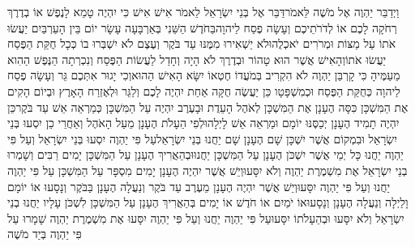 \documentclass[../main/main.tex]{subfiles}
\begin{document}
\begin{multicols*}{\ncols}
וַיְדַבֵּר יַהְוֶה אֶל מֹשֶׁה לֵּאמֹר\PreVerseSpace{}דַּבֵּר אֶל בְּנֵי יִשְׂרָאֵל לֵאמֹר אִישׁ אִישׁ כִּי יִהְיֶה טָמֵא לָנֶפֶשׁ אוֹ בְדֶרֶךְ רְחֹקָה לָכֶם אוֹ לְדֹרֹתֵיכֶם וְעָשָׂה פֶסַח לַיהוָה\PreVerseSpace{}בַּחֹדֶשׁ הַשֵּׁנִי בְּאַרְבָּעָה עָשָׂר יוֹם בֵּין הָעַרְבַּיִם יַעֲשׂוּ אֹתוֹ עַל מַצּוֹת וּמְרֹרִים יֹאכְלֻהוּ\PreVerseSpace{}לֹא יַשְׁאִירוּ מִמֶּנּוּ עַד בֹּקֶר וְעֶצֶם לֹא יִשְׁבְּרוּ בוֹ כְּכָל חֻקַּת הַפֶּסַח יַעֲשׂוּ אֹתוֹ\PreVerseSpace{}וְהָאִישׁ אֲשֶׁר הוּא טָהוֹר וּבְדֶרֶךְ לֹא הָיָה וְחָדַל לַעֲשׂוֹת הַפֶּסַח וְנִכְרְתָה הַנֶּפֶשׁ הַהִוא מֵעַמֶּיהָ כִּי קָרְבַּן יַהְוֶה לֹא הִקְרִיב בְּמֹעֲדוֹ חֶטְאוֹ יִשָּׂא הָאִישׁ הַהוּא\PreVerseSpace{}וְכִי יָגוּר אִתְּכֶם גֵּר וְעָשָׂה פֶסַח לַיהוָה כְּחֻקַּת הַפֶּסַח וּכְמִשְׁפָּטָו\SubEnd{} כֵּן יַעֲשֶׂה חֻקָּה אַחַת יִהְיֶה לָכֶם וְלַגֵּר וּלְאֶזְרַח הָאָרֶץ \ClosedSection{}וּבְיוֹם הָקִים אֶת הַמִּשְׁכָּן כִּסָּה הֶעָנָן אֶת הַמִּשְׁכָּן לְאֹהֶל הָעֵדֻת וּבָעֶרֶב יִהְיֶה עַל הַמִּשְׁכָּן כְּמַרְאֵה אֵשׁ עַד בֹּקֶר\PreVerseSpace{}כֵּן יִהְיֶה תָמִיד הֶעָנָן יְכַסֶּנּוּ יוֹמָם\OmitEnd{} וּמַרְאֵה אֵשׁ לָיְלָה\PreVerseSpace{}וּלְפִי הֵעָלֹת הֶעָנָן מֵעַל הָאֹהֶל וְאַחֲרֵי כֵן יִסְעוּ בְּנֵי יִשְׂרָאֵל וּבִמְקוֹם אֲשֶׁר יִשְׁכָּן שָׁם הֶעָנָן שָׁם יַחֲנוּ בְּנֵי יִשְׂרָאֵל\PreVerseSpace{}עַל פִּי יַהְוֶה יִסְעוּ בְּנֵי יִשְׂרָאֵל וְעַל פִּי יַהְוֶה יַחֲנוּ כָּל יְמֵי אֲשֶׁר יִשְׁכֹּן הֶעָנָן עַל הַמִּשְׁכָּן יַחֲנוּ\PreVerseSpace{}וּבְהַאֲרִיךְ הֶעָנָן עַל הַמִּשְׁכָּן יָמִים רַבִּים וְשָׁמְרוּ בְנֵי יִשְׂרָאֵל אֶת מִשְׁמֶרֶת יַהְוֶה וְלֹא יִסָּעוּ\PreVerseSpace{}וְיֵשׁ אֲשֶׁר יִהְיֶה הֶעָנָן יָמִים מִסְפָּר עַל הַמִּשְׁכָּן עַל פִּי יַהְוֶה יַחֲנוּ וְעַל פִּי יַהְוֶה יִסָּעוּ\PreVerseSpace{}וְיֵשׁ אֲשֶׁר יִהְיֶה הֶעָנָן מֵעֶרֶב עַד בֹּקֶר וְנַעֲלָה הֶעָנָן בַּבֹּקֶר וְנָסָעוּ אוֹ יוֹמָם וָלַיְלָה וְנַעֲלָה הֶעָנָן וְנָסָעוּ\PreVerseSpace{}אוֹ יֹמַיִם אוֹ חֹדֶשׁ אוֹ יָמִים בְּהַאֲרִיךְ הֶעָנָן עַל הַמִּשְׁכָּן לִשְׁכֹּן עָלָיו יַחֲנוּ בְנֵי יִשְׂרָאֵל וְלֹא יִסָּעוּ וּבְהֵעָלֹתוֹ יִסָּעוּ\PreVerseSpace{}עַל פִּי יַהְוֶה יַחֲנוּ וְעַל פִּי יַהְוֶה יִסָּעוּ אֶת מִשְׁמֶרֶת יַהְוֶה שָׁמָרוּ עַל פִּי יַהְוֶה בְּיַד מֹשֶׁה\OpenSection{}\par

\end{multicols*}
\end{document}
